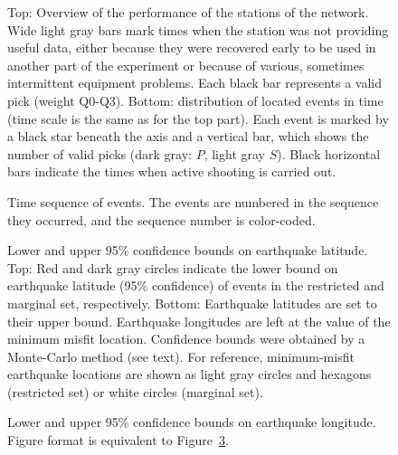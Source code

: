 \documentclass[jgr]{agu2001}
\renewcommand{\includefig}[2]{}
\newlength{\tw}
\begin{document}
\begin{figure}

\includefig{timeline/timeline}{0.8\tw} %

\caption{Top: Overview of the performance of the stations of the network.
Wide light gray bars mark times when the station was not providing
useful data, either because they were recovered early to be used in
another part of the experiment or because of various, sometimes
intermittent equipment problems.  Each black bar represents a valid
pick (weight Q0-Q3).  Bottom: distribution of located events in time
(time scale is the same as for the top part).  Each event is marked by
a black star beneath the axis and a
vertical bar, which shows the number of valid picks (dark gray: $P$, light
gray $S$).  Black horizontal bars indicate the times when active
shooting is carried out.}
\label{fig:timeline}
\end{figure}

\begin{figure}

\includefig{time-map/time-map}{0.8\tw} %

\caption{Time sequence of events.  The events are numbered in the
sequence they occurred, and the sequence number is color-coded.}
\label{fig:time-map}
\end{figure}


\begin{figure}

\includefig{seismag-map-95/seismag-map-95-0}{0.65\tw} %

\includefig{seismag-map-95/seismag-map-95-1}{0.65\tw} %

\caption{Lower and upper 95\% confidence bounds on earthquake
latitude.   Top: Red and dark gray circles
indicate the lower bound on earthquake latitude (95\% confidence) of
events in the restricted and marginal set, respectively.
Bottom: Earthquake latitudes are set to their upper bound.
Earthquake longitudes are left at the value of the minimum misfit
location.  Confidence bounds were obtained by a Monte-Carlo method
(see text). For reference, minimum-misfit earthquake locations are shown as 
 light gray circles and hexagons  (restricted set) or white circles
(marginal set). }
\label{fig:map95lat}
\end{figure}


\begin{figure}

\includefig{seismag-map-95/seismag-map-95-2}{0.65\tw} %

\includefig{seismag-map-95/seismag-map-95-3}{0.65\tw} %

\caption{Lower and upper 95\% confidence bounds on earthquake
longitude.  Figure format is equivalent to Figure~\ref{fig:map95lat}. }
\label{fig:map95lon}
\end{figure}
\end{document}
